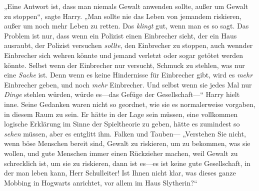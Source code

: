 „Eine Antwort ist, dass man niemals Gewalt anwenden sollte, außer um Gewalt zu stoppen“, sagte Harry. „Man sollte nie das Leben von jemandem riskieren, außer um noch mehr Leben zu retten. Das \emph{klingt} gut, wenn man es so sagt. Das Problem ist nur, dass wenn ein Polizist einen Einbrecher sieht, der ein Haus ausraubt, der Polizist versuchen \emph{sollte}, den Einbrecher zu stoppen, auch wennder Einbrecher sich wehren könnte und jemand verletzt oder sogar getötet werden könnte. Selbst wenn der Einbrecher nur versucht, Schmuck zu stehlen, was nur eine \emph{Sache} ist. Denn wenn es keine Hindernisse für Einbrecher gibt, wird es \emph{mehr} Einbrecher geben, und noch \emph{mehr} Einbrecher. Und selbst wenn sie jedes Mal nur \emph{Dinge} stehlen würden, würde es—das Gefüge der Gesellschaft—“ Harry hielt inne. Seine Gedanken waren nicht so geordnet, wie sie es normalerweise vorgaben, in diesem Raum zu sein. Er hätte in der Lage sein müssen, eine vollkommen logische Erklärung im Sinne der Spieltheorie zu geben, hätte es zumindest so \emph{sehen} müssen, aber es entglitt ihm. Falken und Tauben— „Verstehen Sie nicht, wenn böse Menschen bereit sind, Gewalt zu riskieren, um zu bekommen, was sie wollen, und gute Menschen immer einen Rückzieher machen, weil Gewalt zu schrecklich ist, um sie zu riskieren, dann ist es—es ist keine gute Gesellschaft, in der man leben kann, Herr Schulleiter! Ist Ihnen nicht klar, was dieses ganze Mobbing in Hogwarts anrichtet, vor allem im Haus Slytherin?“

